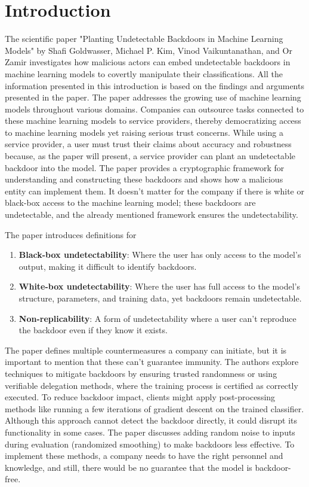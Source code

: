 \documentclass[
	fontsize=12pt,
	headings=small,
	parskip=quarter,
	bibliography=totoc,
	numbers=noenddot,       
	open=any,               
 	final                   
]{scrreprt}
\begin{document}
\chapter{Introduction}
The scientific paper "Planting Undetectable Backdoors in Machine Learning Models" by Shafi Goldwasser, Michael P. Kim, Vinod Vaikuntanathan, and Or Zamir \cite{goldwasser2022backdoors} investigates how malicious actors can embed undetectable backdoors in machine learning models to covertly manipulate their classifications. All the information presented in this introduction is based on the findings and arguments presented in the paper. The paper addresses the growing use of machine learning models throughout various domains. Companies can outsource tasks connected to these machine learning models to service providers, thereby democratizing access to machine learning models yet raising serious trust concerns. While using a service provider, a user must trust their claims about accuracy and robustness because, as the paper will present, a service provider can plant an undetectable backdoor into the model. The paper provides a cryptographic framework for understanding and constructing these backdoors and shows how a malicious entity can implement them. It doesn’t matter for the company if there is white or black-box access to the machine learning model; these backdoors are undetectable, and the already mentioned framework ensures the undetectability.
\par The paper introduces definitions for  
\begin{enumerate} \itemsep -5pt
	\item \textbf{Black-box undetectability}: Where the user has only access to the model's output, making it difficult to identify backdoors. 
	\item \textbf{White-box undetectability}: Where the user has full access to the model's structure, parameters, and training data, yet backdoors remain undetectable. 
	\item \textbf{Non-replicability}: A form of undetectability where a user can't reproduce the backdoor even if they know it exists. 
\end{enumerate}
\par The paper defines multiple countermeasures a company can initiate, but it is important to mention that these can't guarantee immunity. The authors explore techniques to mitigate backdoors by ensuring trusted randomness or using verifiable delegation methods, where the training process is certified as correctly executed. To reduce backdoor impact, clients might apply post-processing methods like running a few iterations of gradient descent on the trained classifier. Although this approach cannot detect the backdoor directly, it could disrupt its functionality in some cases. The paper discusses adding random noise to inputs during evaluation (randomized smoothing) to make backdoors less effective. To implement these methods, a company needs to have the right personnel and knowledge, and still, there would be no guarantee that the model is backdoor-free.
\end{document}
